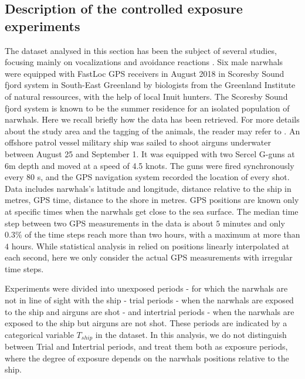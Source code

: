 \documentclass[11pt]{article}
\newcommand {\1}{\mathbb{1}}
\begin{document}
\subsection{Description of the controlled exposure experiments}

The dataset analysed in this section has been the subject of several studies, focusing mainly on vocalizations and avoidance reactions \cite{heide-jorgensen_behavioral_2021,tervo_narwhals_2021}. 
Six male narwhals were equipped with FastLoc GPS receivers in August 2018 in Scoresby Sound fjord system in South-East Greenland by biologists from the Greenland Institute of natural ressources, with the help of local Inuit hunters. The Scoresby Sound fjord system
is known to be the summer residence for an isolated population of narwhals.
Here we recall briefly how the data has been retrieved. For more details about the study area and the tagging of the animals, the reader may refer to \cite{heide-jorgensen_behavioral_2021}. 
An offshore patrol vessel military ship was sailed to shoot airguns underwater between August 25 and September 1. It was equipped with two Sercel G-guns at 6m depth and moved at a speed of 4.5 knots. The guns were fired synchronously every 80 s, and the GPS navigation system recorded the location of every shot. 
Data includes narwhals's latitude and longitude, distance relative to the ship in metres, GPS time, distance to the shore in metres. GPS positions are known only at specific times when the narwhals get close to the sea surface. The median time step between two GPS measurements in the data is about $5$ minutes and only $0.3 \%$ of the time steps reach more than two hours, with a maximum at more than $4$ hours. While statistical analysis in \cite{heide-jorgensen_behavioral_2021} relied on positions linearly interpolated at each second, here we only consider the actual GPS measurements with irregular time steps.



Experiments were divided into unexposed periods - for which the narwhals are not in line of sight with the ship - trial periods - when the narwhals are exposed to the ship and airguns are shot - and intertrial periods - when the narwhals are exposed to the ship but airguns are not shot. These periods are indicated by a categorical variable $T_{ship}$ in the dataset. In this analysis, we do not distinguish between Trial and Intertrial periods, and treat them both as exposure periods, where the degree of exposure depends on the narwhals positions relative to the ship.
\end{document}
